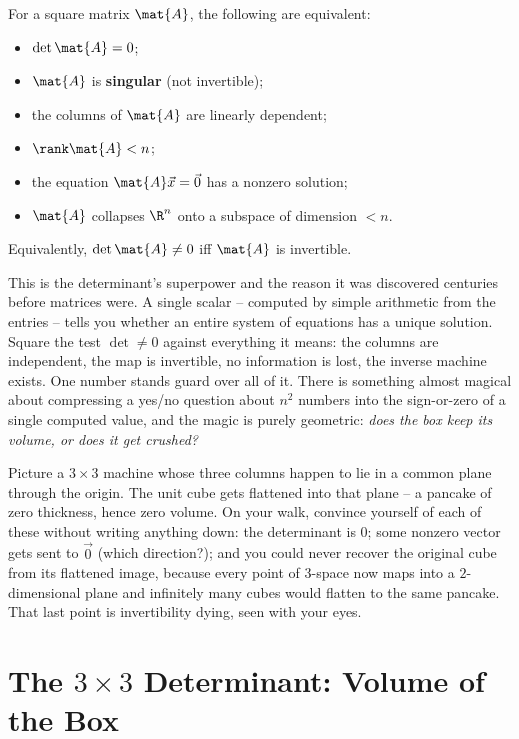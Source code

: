 \begin{formalbox}
For a square matrix $\mat{A}$, the following are equivalent:
\begin{itemize}
  \item $\det\mat{A} = 0$;
  \item $\mat{A}$ is \textbf{singular} (not invertible);
  \item the columns of $\mat{A}$ are linearly dependent;
  \item $\rank\mat{A} < n$;
  \item the equation $\mat{A}\vec x = \vec 0$ has a nonzero solution;
  \item $\mat{A}$ collapses $\R^n$ onto a subspace of dimension $< n$.
\end{itemize}
Equivalently, $\det\mat{A}\neq 0$ iff $\mat{A}$ is invertible.
\end{formalbox}

\begin{aestheticbox}
This is the determinant's superpower and the reason it was discovered centuries
before matrices were. A single scalar -- computed by simple arithmetic from the
entries -- tells you whether an entire system of equations has a unique solution.
Square the test $\det\neq 0$ against everything it means: the columns are
independent, the map is invertible, no information is lost, the inverse machine
exists. One number stands guard over all of it. There is something almost magical
about compressing a yes/no question about $n^2$ numbers into the sign-or-zero of a
single computed value, and the magic is purely geometric: \emph{does the box keep
its volume, or does it get crushed?}
\end{aestheticbox}

\begin{walkbox}
Picture a $3\times 3$ machine whose three columns happen to lie in a common plane
through the origin. The unit cube gets flattened into that plane -- a pancake of
zero thickness, hence zero volume. On your walk, convince yourself of each of
these without writing anything down: the determinant is $0$; some nonzero vector
gets sent to $\vec 0$ (which direction?); and you could never recover the original
cube from its flattened image, because every point of $3$-space now maps into a
$2$-dimensional plane and infinitely many cubes would flatten to the same pancake.
That last point is invertibility dying, seen with your eyes.
\end{walkbox}

\section{The $3\times 3$ Determinant: Volume of the Box}
\label{ch21:3x3}


